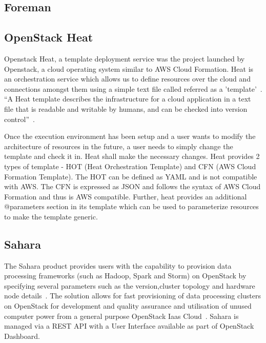      \pv

\subsection{Foreman}

\pv 

\subsection{OpenStack Heat}

Openstack Heat, a template deployment service was the project launched
by Openstack, a cloud operating system similar to AWS Cloud
Formation. Heat is an orchestration service which allows us to define
resources over the cloud and connections amongst them using a simple
text file called referred as a
'template'~\cite{www-heat-blog-introduction}.  ``A Heat template
describes the infrastructure for a cloud application in a text file
that is readable and writable by humans, and can be checked into
version control''~\cite{www-heat-wiki}.

     Once the execution environment has been setup and a user wants to
     modify the architecture of resources in the future, a user needs
     to simply change the template and check it in. Heat shall make
     the necessary changes. Heat provides 2 types of template -
     HOT (Heat Orchestration Template) and CFN (AWS Cloud Formation
     Template). The HOT can be defined as YAML and is not compatible
     with AWS. The CFN is expressed as JSON and follows the syntax of
     AWS Cloud Formation and thus is AWS compatible. Further, heat
     provides an additional @parameters section in its template which
     can be used to parameterize resources to make the template
     generic.

     \pv

\subsection{Sahara}

The Sahara product provides users with the capability to provision
data processing frameworks (such as Hadoop, Spark and Storm) on
OpenStack by specifying several parameters such as the version,cluster
topology and hardware node details~\cite{www-openStack}. The solution
allows for fast provisioning of data processing clusters on OpenStack
for development and quality assurance and utilisation of unused
computer power from a general purpose OpenStack Iaas
Cloud~\cite{www-Sahara}.  Sahara is managed via a REST API with a User
Interface available as part of OpenStack Dashboard.

